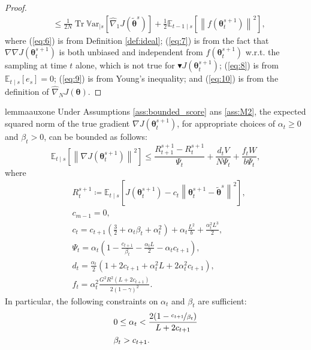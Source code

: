 \documentclass{article}
\makeatletter
\theoremstyle{remark}
\theoremstyle{definition}
\DeclareRobustCommand{\wrt}{w.r.t.\@\xspace}
\DeclareMathOperator{\Tr}{Tr}
\newcommand{\norm}[2][\infty]{\left\|#2\right\|_{#1}}
\newcommand{\dnabla}{\nabla\!\!\!\!\nabla}
\newcommand{\vtheta}{\boldsymbol{\theta}}
\newcommand{\gradJ}[1]{\nabla J(#1)}
\newcommand{\gradApp}[2]{\widehat{\nabla}_{#2}J(#1)}
\newcommand{\Ets}[2][t]{\mathbb{E}_{#1\mid s}\left[#2\right]}
\newcommand{\Varts}[2][t]{{\mathbb{V}\text{ar}}_{#1\mid s}\left[#2\right]}
\newcommand{\gradBlack}[1]{\blacktriangledown J(#1)}
\newcommand{\gradIdeal}[1]{\dnabla J(#1)}
\makeatother
\begin{document}
\begin{proof}
\begin{align}
	&\leq
	\frac{1}{2N}\Tr\Varts[]{\gradApp{\tilde{\vtheta}^s}{1}} +\frac{1}{2}\Ets[t-1]{\norm[]{f(\vtheta_t^{s+1})}^2},
	\nonumber
\end{align}
where (\ref{eq:6}) is from Definition \ref{def:ideal}; (\ref{eq:7}) is from the fact that $\gradIdeal{\vtheta_t^{s+1}}$ is both unbiased and independent from $f(\vtheta_t^{s+1})$ \wrt the sampling at time $t$ alone, which is not true for $\gradBlack{\vtheta_t^{s+1}}$; (\ref{eq:8}) is from $\Ets{e_s}=0$; (\ref{eq:9}) is from Young's inequality; and (\ref{eq:10}) is from the definition of $\gradApp{\vtheta}{N}$.
\end{proof}

\begin{restatable}[]{lemma}{auxone}\label{lemma:aux1}
Under Assumptions \ref{ass:bounded_score} ans \ref{ass:M2}, the expected squared norm of the true gradient $\gradJ{\vtheta_t^{s+1}}$, for appropriate choices of $\alpha_t\geq0$ and $\beta_t>0$, can be bounded as follows:
\[
	\Ets{\norm[]{\gradJ{\vtheta_t^{s+1}}}^2} \leq
	\frac{R_{t+1}^{s+1} - R_t^{s+1}}{\Psi_t} + \frac{d_tV}{N\Psi_t}
	+\frac{f_tW}{b\Psi_t},
\]
	where
\begin{align*}
	&R_t^{s+1}\coloneqq \Ets{J(\vtheta_t^{s+1}) - c_t\norm[]{\vtheta_t^{s+1}-\tilde{\vtheta}^s}^2}, \\
	&c_{m-1} = 0, \\
	&c_t = c_{t+1}\left(\frac{3}{2}+\alpha_t\beta_t+\alpha_t^2\right) + \alpha_t\frac{L^2}{b}+\frac{\alpha_t^2L^3}{2}, \\
	&\Psi_t = \alpha_t\left(1-\frac{c_{t+1}}{\beta_t}-\frac{\alpha_tL}{2}-\alpha_tc_{t+1}\right), \\
	&d_t = \frac{\alpha_t}{2}\left(1+2c_{t+1}+\alpha_t^2L+2\alpha_t^2c_{t+1}\right), \\
	&f_t = \alpha_t^2\frac{G^2R^2(L+2c_{t+1})}{2(1-\gamma)^2}.
\end{align*}
In particular, the following constraints on $\alpha_t$ and $\beta_t$ are sufficient:
\begin{align*}
&0\leq\alpha_t < \frac{2(1-\nicefrac{c_{t+1}}{\beta_t})}{L+2c_{t+1}} \\
&\beta_t > c_{t+1}.
\end{align*}
\end{restatable}
\end{document}
